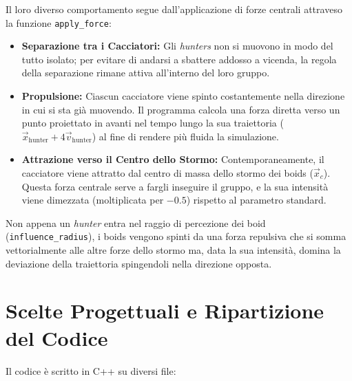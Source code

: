 \documentclass[11pt, a4paper]{article}
\begin{document}
Il loro diverso comportamento segue dall'applicazione di forze centrali attraveso la funzione \texttt{apply\_force}:
\begin{itemize}
    \item \textbf{Separazione tra i Cacciatori:} Gli \textit{hunters} non si muovono in modo del tutto isolato; per evitare di andarsi a sbattere addosso a vicenda, la regola della separazione rimane attiva all'interno del loro gruppo.
    \item \textbf{Propulsione:} Ciascun cacciatore viene spinto costantemente nella direzione in cui si sta già muovendo. Il programma calcola una forza diretta verso un punto proiettato in avanti nel tempo lungo la sua traiettoria ($\vec{x}_{\text{hunter}} + 4\vec{v}_{\text{hunter}}$) al fine di rendere più fluida la simulazione.
    \item \textbf{Attrazione verso il Centro dello Stormo:} Contemporaneamente, il cacciatore viene attratto dal centro di massa dello stormo dei boids ($\vec{x}_c$). Questa forza centrale serve a fargli inseguire il gruppo, e la sua intensità viene dimezzata (moltiplicata per $-0.5$) rispetto al parametro standard.
\end{itemize}

Non appena un \textit{hunter} entra nel raggio di percezione dei boid (\texttt{influence\_radius}), i boids vengono spinti da una forza repulsiva che si somma vettorialmente alle altre forze dello stormo ma, data la sua intensità, domina la deviazione della traiettoria spingendoli nella direzione opposta.

\section{Scelte Progettuali e Ripartizione del Codice}
\label{sec:progettazione}
Il codice è scritto in C++ su diversi file:
\end{document}
